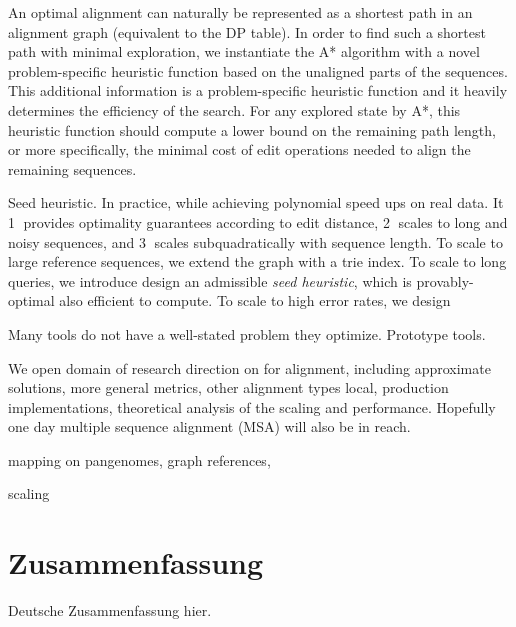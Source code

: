 An optimal alignment can naturally be represented as a shortest path in an
alignment graph (equivalent to the DP table). In order to find such a shortest
path with minimal exploration, we instantiate the A* algorithm with a novel
problem-specific heuristic function based on the unaligned parts of the
sequences. This additional information is a problem-specific heuristic function
and it heavily determines the efficiency of the search. For any explored state
by A*, this heuristic function should compute a lower bound on the remaining
path length, or more specifically, the minimal cost of edit operations needed to
align the remaining sequences.

Seed heuristic. In practice, while achieving polynomial speed ups on real data.
It \textcircled{1} provides optimality guarantees according to edit distance,
\textcircled{2} scales to long and noisy sequences, and \textcircled{3} scales
subquadratically with sequence length. To scale to large reference sequences, we
extend the graph with a trie index. To scale to long queries, we introduce
design an admissible \emph{seed heuristic}, which is provably-optimal also
efficient to compute. To scale to high error rates, we design  

Many tools do not have a well-stated problem they optimize. Prototype tools.

We open domain of research direction on \A for alignment, including approximate
solutions, more general metrics, other alignment types local, production
implementations, theoretical analysis of the scaling and performance. Hopefully
one day multiple sequence alignment (MSA) will also be in reach.

mapping on pangenomes, graph references, 

scaling


\endgroup

\cleardoublepage%

\begingroup
\let\clearpage\relax
\let\cleardoublepage\relax
\let\cleardoublepage\relax

\chapter*{Zusammenfassung}

Deutsche Zusammenfassung hier.


\endgroup

\vfill
